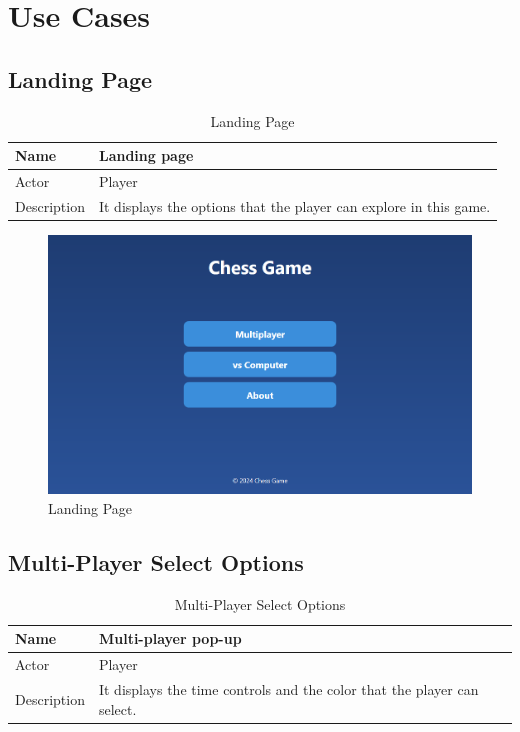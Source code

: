 \documentclass[a4paper,12pt]{article}
\begin{document}
\section{Use Cases}

\subsection{Landing Page}

\begin{longtable}{|m{}|m{}|}
    \caption{Landing Page} \\
    \hline
    Name & Landing page \\
    \hline
    Actor & Player \\
    \hline
    Description & It displays the options that the player can explore in this game. \\ 
    \hline
\end{longtable}

\begin{figure}[H]
    \centering
    \includegraphics[width=0.7\linewidth]{Images/Use Cases/landingPage.png}
    \caption{Landing Page}
    \label{fig:landingPage}
\end{figure}
    
\subsection{Multi-Player Select Options}

\begin{longtable}{|m{}|m{}|}
    \caption{Multi-Player Select Options} \\
    \hline
    Name & Multi-player pop-up \\
    \hline
    Actor & Player \\
    \hline
    Description & It displays the time controls and the color that the player can select. \\ 
    \hline
\end{longtable}
\end{document}
